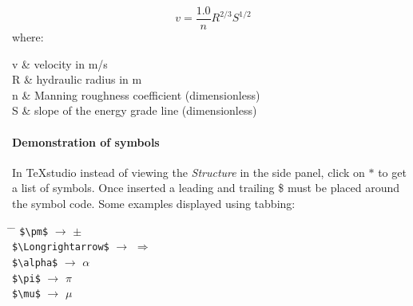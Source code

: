 \begin{center}
\begin{minipage}{\columnwidth}%
	\begin{equation}\label{equ:Manning}
		v = \frac{1.0}{n} R^{2/3} S^{1/2}	
	\end{equation}
	where:
	\begin{conditions}
		v	&	velocity in m/s\\
		R	&	hydraulic radius in m\\
		n	&	Manning roughness coefficient (dimensionless)\\   
		S	&	slope of the energy grade line (dimensionless)
	\end{conditions}
\end{minipage}
\end{center}

\paragraph{Demonstration of symbols}
In TeXstudio instead of viewing the \textit{Structure} in the side panel, click on $\ast$ to get a list of symbols. Once inserted a leading and trailing \$ must be placed around the symbol code. Some examples displayed using tabbing:
\begin{tabbing}
	\hspace{2in}     			\= \hspace{0.40in}  \= \hspace{1in}    		\kill
	\verb!$\pm$! 				\> $\rightarrow$ 	\> $\pm$ 				\\
	\verb!$\Longrightarrow$! 	\> $\rightarrow$ 	\> $\Longrightarrow$ 	\\
	\verb!$\alpha$! 			\> $\rightarrow$ 	\> $\alpha$ 			\\
	\verb!$\pi$! 				\> $\rightarrow$ 	\> $\pi$ 				\\
	\verb!$\mu$! 				\> $\rightarrow$ 	\> $\mu$	 			\\
\end{tabbing}

